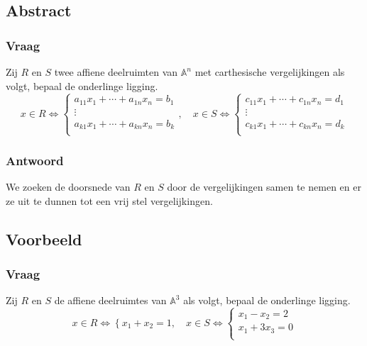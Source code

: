 \documentclass[main.tex]{subfiles}
\begin{document}
\subsection{Abstract}
\subsubsection{Vraag}
\begin{center}
  Zij $R$ en $S$ twee affiene deelruimten van $\mathbb{A}^{n}$ met carthesische vergelijkingen als volgt, bepaal de onderlinge ligging.
  \[
  x \in R \Leftrightarrow
  \left\{
    \begin{array}{c}
      a_{11}x_{1} + \dotsb + a_{1n}x_{n} = b_{1}\\
      \vdots\\
      a_{k1}x_{1} + \dotsb + a_{kn}x_{n} = b_{k}\\
    \end{array}
  \right.
  ,\quad
  x \in S \Leftrightarrow
  \left\{
    \begin{array}{c}
      c_{11}x_{1} + \dotsb + c_{1n}x_{n} = d_{1}\\
      \vdots\\
      c_{k1}x_{1} + \dotsb + c_{kn}x_{n} = d_{k}\\
    \end{array}
  \right.
  \]
\end{center}
\subsubsection{Antwoord}
We zoeken de doorsnede van $R$ en $S$ door de vergelijkingen samen te nemen en er ze uit te dunnen tot een vrij stel vergelijkingen.

\subsection{Voorbeeld}
\subsubsection{Vraag}
\begin{center}
  Zij $R$ en $S$ de affiene deelruimtes van $\mathbb{A}^{3}$ als volgt, bepaal de onderlinge ligging.
  \[
  x \in R \Leftrightarrow
  \left\{
  x_{1}+x_{2}=1
  \right.
  ,\quad
  x\in S \Leftrightarrow
  \left\{
    \begin{array}{c}
      x_{1}-x_{2} = 2\\
      x_{1} + 3x_{3} = 0\\
    \end{array}
  \right.
  \]
\end{center}
\end{document}

